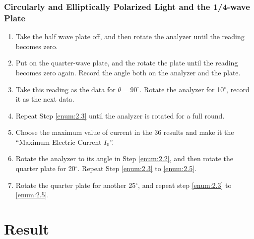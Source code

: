 \documentclass{my_template}
\begin{document}
    \subsubsection{Circularly and Elliptically Polarized Light and the 1/4-wave Plate}
    \begin{enumerate}
        \item Take the half wave plate off, and then rotate the analyzer until the reading becomes zero.
        \item Put on the quarter-wave plate, and the rotate the plate until the reading becomes zero again. Record the angle both on the analyzer and the plate.\label{enum:2.2}
        \item Take this reading as the data for $\theta=90^\circ$. Rotate the analyzer for 10$^\circ$, record it as the next data.\label{enum:2.3}
        \item Repeat Step \ref{enum:2.3} until the analyzer is rotated for a full round.
        \item Choose the maximum value of current in the 36 results and make it the ``Maximum Electric Current $I_0$''.\label{enum:2.5}
        \item Rotate the analyzer to its angle in Step \ref{enum:2.2}, and then rotate the quarter plate for 20$^\circ$. Repeat Step \ref{enum:2.3} to \ref{enum:2.5}.
        \item Rotate the quarter plate for another 25$^\circ$, and repeat step \ref{enum:2.3} to \ref{enum:2.5}.
    \end{enumerate}
    \section{Result}
\end{document}
